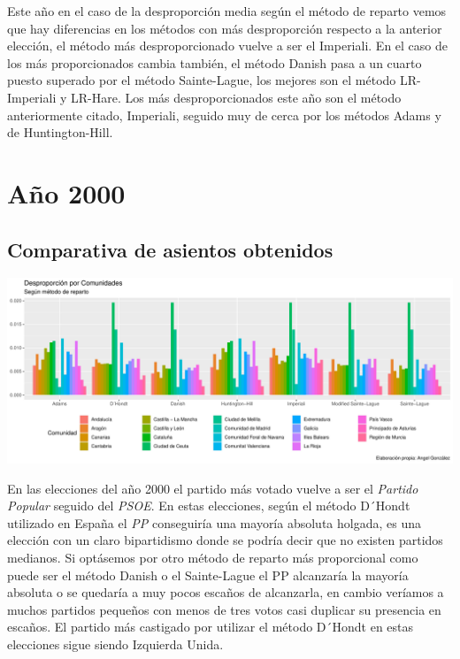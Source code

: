 \documentclass[12pt,a4paper,]{book}
\numberwithin{dummy}{section}
\theoremstyle{ocrenumbox}
\theoremstyle{blacknumex}
\theoremstyle{blacknumbox}
\theoremstyle{ocrenum}
\theoremstyle{ocrenum}
\begin{document}
Este año en el caso de la desproporción media según el método de reparto
vemos que hay diferencias en los métodos con más desproporción respecto
a la anterior elección, el método más desproporcionado vuelve a ser el
Imperiali. En el caso de los más proporcionados cambia también, el
método Danish pasa a un cuarto puesto superado por el método
Sainte-Lague, los mejores son el método LR-Imperiali y LR-Hare. Los más
desproporcionados este año son el método anteriormente citado,
Imperiali, seguido muy de cerca por los métodos Adams y de
Huntington-Hill.

\hypertarget{auxf1o-2000}{%
\section{Año 2000}\label{auxf1o-2000}}

\hypertarget{comparativa-de-asientos-obtenidos-7}{%
\subsection{Comparativa de asientos
obtenidos}\label{comparativa-de-asientos-obtenidos-7}}

\begin{center}\includegraphics[width=1\linewidth]{figurasR/unnamed-chunk-99-1} \end{center}

En las elecciones del año 2000 el partido más votado vuelve a ser el
\emph{Partido Popular} seguido del \emph{PSOE}. En estas elecciones,
según el método D´Hondt utilizado en España el \emph{PP} conseguiría una
mayoría absoluta holgada, es una elección con un claro bipartidismo
donde se podría decir que no existen partidos medianos. Si optásemos por
otro método de reparto más proporcional como puede ser el método Danish
o el Sainte-Lague el PP alcanzaría la mayoría absoluta o se quedaría a
muy pocos escaños de alcanzarla, en cambio veríamos a muchos partidos
pequeños con menos de tres votos casi duplicar su presencia en escaños.
El partido más castigado por utilizar el método D´Hondt en estas
elecciones sigue siendo Izquierda Unida.
\end{document}
